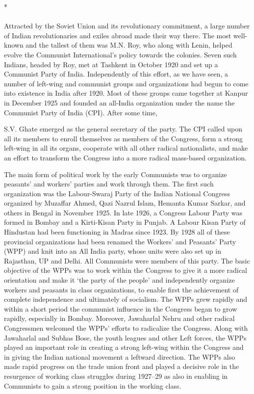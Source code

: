 \begin{multicols}{2}
\begin{center}*\end{center}

\paragraph*{}

Attracted by the Soviet Union and its revolutionary commitment, a large number of Indian revolutionaries and exiles abroad made their way there. The most well-known and the tallest of them was M.N. Roy, who along with Lenin, helped evolve the Communist International's policy towards the colonies. Seven such Indians, headed by Roy, met at Tashkent in October 1920 and set up a Communist Party of India. Independently of this effort, as we have seen, a number of left-wing and communist groups and organizations had begun to come into existence in India after 1920. Most of these groups came together at Kanpur in December 1925 and founded an all-India organization under the name the Communist Party of India (CPI). After some time, 

S.V. Ghate emerged as the general secretary of the party. The CPI called upon all its members to enroll themselves as members of the Congress, form a strong left-wing in all its organs, cooperate with all other radical nationalists, and make an effort to transform the Congress into a more radical mass-based organization. 

The main form of political work by the early Communists was to organize peasants' and workers' parties and work through them. The first such organization was the Labour-Swaraj Party of the Indian National Congress organized by Muzaffar Ahmed, Qazi Nazrul Islam, Hemanta Kumar Sarkar, and others in Bengal in November 1925. In late 1926, a Congress Labour Party was formed in Bombay and a Kirti-Kisan Party in Punjab. A Labour Kisan Party of Hindustan had been functioning in Madras since 1923. By 1928 all of these provincial organizations had been renamed the Workers' and Peasants' Party (WPP) and knit into an All India party, whose units were also set up in Rajasthan, UP and Delhi. All Communists were members of this party. The basic objective of the WPPs was to work within the Congress to give it a more radical orientation and make it `the party of the people' and independently organize workers and peasants in class organizations, to enable first the achievement of complete independence and ultimately of socialism. The WPPs grew rapidly and within a short period the communist influence in the Congress began to grow rapidly, especially in Bombay. Moreover, Jawaharlal Nehru and other radical Congressmen welcomed the WPPs' efforts to radicalize the Congress. Along with Jawaharlal and Subhas Bose, the youth leagues and other Left forces, the WPPs played an important role in creating a strong left-wing within the Congress and in giving the Indian national movement a leftward direction. The WPPs also made rapid progress on the trade union front and played a decisive role in the resurgence of working class struggles during 1927--29 as also in enabling in Communists to gain a strong position in the working class. 


\end{multicols}

